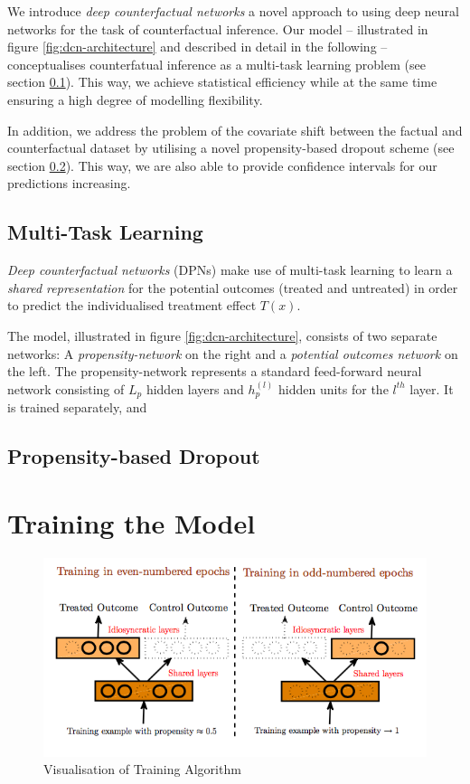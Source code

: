We introduce \emph{deep counterfactual networks} a novel approach to using deep neural networks for the task of counterfactual inference. Our model -- illustrated in figure \ref{fig:dcn-architecture} and described in detail in the following -- conceptualises counterfatual inference as a multi-task learning problem (see section \ref{sec:multi-task-learning}). This way, we achieve  statistical efficiency while at the same time ensuring a high degree of modelling flexibility. 

In addition, we address the  problem of the covariate shift between the factual and counterfactual dataset by utilising a novel propensity-based dropout scheme (see section \ref{sec:propensity-based-dropout}). This way, we are also able to provide confidence intervals for our predictions increasing. 

\subsection{Multi-Task Learning} \label{sec:multi-task-learning}
\emph{Deep counterfactual networks} (DPNs) make use of multi-task learning to learn a \emph{shared representation} for the potential outcomes (treated and untreated) in order to predict the individualised treatment effect $T(x)$. 

The model, illustrated in figure \ref{fig:dcn-architecture}, consists of two separate networks: A \emph{propensity-network} on the right and a \emph{potential outcomes network} on the left.
The propensity-network represents a standard feed-forward neural network consisting of $L_p$ hidden layers and $h_p^{(l)}$ hidden units for the $l^{th}$ layer. It is trained separately, and 

\subsection{Propensity-based Dropout} \label{sec:propensity-based-dropout}

\section{Training the Model}

\begin{figure}[h]
	\centering
	\includegraphics[width=1.0\textwidth]{figures/chapter-3/pbd-training.png}
	\caption{Visualisation of Training Algorithm}\label{fig:dcn-training}
\end{figure}
